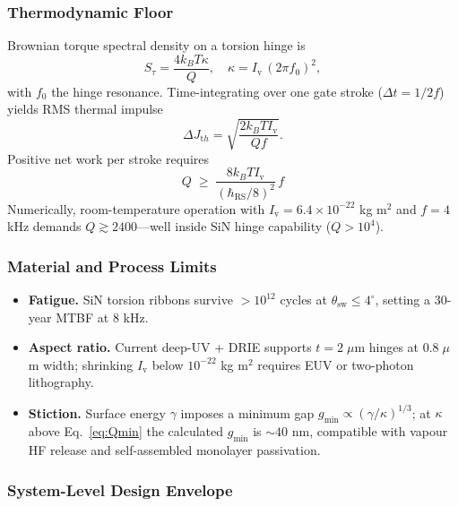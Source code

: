 \documentclass[11pt,oneside]{book}
\begin{document}
\subsubsection{Thermodynamic Floor}
\label{ss:yield-thermal}

Brownian torque spectral density on a torsion hinge is
\[
   S_{\tau} = \frac{4 k_{\!B} T \kappa}{Q},
   \quad
   \kappa = I_{\mathrm v}\,(2\pi f_{0})^{2},
\]
with $f_{0}$ the hinge resonance.  
Time-integrating over one gate stroke ($\Delta t = 1/2f$) yields RMS
thermal impulse
\[
   \Delta J_{\mathrm th}
   = \sqrt{\frac{2k_{\!B}T I_{\mathrm v}}{Q f}}.
\]
Positive net work per stroke requires
\begin{equation}
   \boxed{\;
      Q
      \;\ge\;
      \frac{8 k_{\!B} T I_{\mathrm v}}{(\hbar_{\mathrm{RS}}/8)^{2}}
      \,f
      \;}
   \label{eq:Qmin}
\end{equation}
Numerically, room-temperature operation with  
$I_{\mathrm v}=6.4\times10^{-22}$ kg m$^{2}$ and $f=4$ kHz demands
$Q \gtrsim 2400$—well inside SiN hinge capability ($Q>10^{4}$).

\subsubsection{Material and Process Limits}
\label{ss:yield-material}

\begin{itemize}[leftmargin=*,itemsep=2pt]
\item \textbf{Fatigue.}  
      SiN torsion ribbons survive $>10^{12}$ cycles at
      $\theta_{\mathrm{sw}}\le4^{\circ}$, setting a 30-year MTBF at
      8 kHz.
\item \textbf{Aspect ratio.}  
      Current deep-UV + DRIE supports $t\!=\!2\;\mu$m hinges at
      $0.8\;\mu$m width; shrinking $I_{\mathrm v}$ below
      $10^{-22}$ kg m$^{2}$ requires EUV or two-photon lithography.
\item \textbf{Stiction.}  
      Surface energy $\gamma$ imposes a minimum gap
      $g_{\min} \propto (\gamma/\kappa)^{1/3}$; at $\kappa$ above
      Eq.~\eqref{eq:Qmin} the calculated $g_{\min}$ is $\sim40$ nm,
      compatible with vapour HF release and self-assembled
      monolayer passivation.
\end{itemize}

\subsubsection{System-Level Design Envelope}
\label{ss:yield-envelope}
\end{document}
